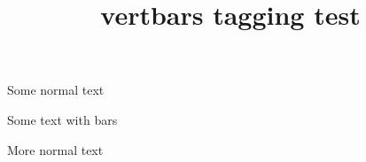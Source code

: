 \documentclass{article}
\title{vertbars tagging test}
\begin{document}
Some normal text
\begin{vertbar}
Some text with bars
\end{vertbar}
More normal text
\end{document}
